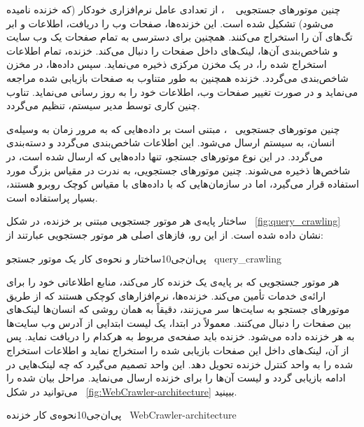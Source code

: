 چنین موتورهای جستجویی
~\cite{Web-Crawling}
، از تعدادی عامل نرم‌افزاری خودکار (که خزنده نامیده می‌شود) تشکیل شده است. این خزنده‌ها، صفحات وب را دریافت، اطلاعات و ابر تگ‌های آن را استخراج می‌کنند. همچنین برای دسترسی به تمام صفحات یک وب سایت و شاخص‌بندی آن‌ها، لینک‌های داخل صفحات را دنبال می‌کند. خزنده، تمام اطلاعات استخراج شده را، در یک مخزن مرکزی ذخیره می‌نماید. سپس داده‌ها، در مخزن شاخص‌بندی می‌گردد. خزنده همچنین به طور متناوب به صفحات بازیابی شده مراجعه می‌نماید و در صورت تغییر صفحات وب، اطلاعات خود را به روز رسانی می‌نماید. تناوب چنین کاری توسط مدیر سیستم، تنظیم می‌گردد.


چنین موتورهای جستجویی
~\cite{Web-Crawling}،
مبتنی است بر داده‌هایی که به مرور زمان به وسیله‌ی انسان، به سیستم ارسال می‌شود. این اطلاعات شاخص‌بندی می‌گردد و دسته‌بندی می‌گردد. در این نوع موتورهای جستجو، تنها داده‌هایی که ارسال شده است، در شاخص‌ها ذخیره می‌شوند. چنین موتورهای جستجویی، به ندرت در مقیاس بزرگ مورد استفاده قرار می‌گیرد، اما در سازمان‌هایی که با داده‌های با مقیاس کوچک روبرو هستند، بسیار پراستفاده است.


ساختار پایه‌ی هر موتور جستجویی مبتنی بر خزنده، در شکل ~\ref{fig:query_crawling} نشان داده شده است. از این رو، فازهای اصلی هر موتور جستجویی عبارتند از:

‌پی‌ان‌جی{10}{ساختار و نحوه‌ی کار یک موتور جستجو
~\cite{Search-in-cloud}}{query_crawling}


هر موتور جستجویی که بر پایه‌ی یک خزنده کار می‌کند، منابع اطلاعاتی خود را برای ارائه‌ی خدمات تأمین می‌کند. خزنده‌ها، نرم‌افزارهای کوچکی هستند که از طریق موتورهای جستجو به سایت‌ها سر می‌زنند، دقیقاً به همان روشی که انسان‌ها لینک‌های بین صفحات را دنبال می‌کنند. معمولاً در ابتدا، یک لیست ابتدایی از آدرس وب سایت‌ها به هر خزنده داده می‌شود. خزنده باید صفحه‌ی مربوط به هرکدام را دریافت نماید. پس از آن، لینک‌های داخل این صفحات بازیابی شده را استخراج نماید و اطلاعات استخراج شده را به واحد کنترل خزنده تحویل دهد. این واحد تصمیم می‌گیرد که چه لینک‌هایی در ادامه بازیابی گردد و لیست آن‌ها را برای خزنده ارسال می‌نماید.
مراحل بیان شده را می‌توانید در شکل ~\ref {fig:WebCrawler-architecture} ببینید.

‌پی‌ان‌جی{10}{نحوه‌ی کار خزنده
~\cite{Googlebot}}{WebCrawler-architecture}

